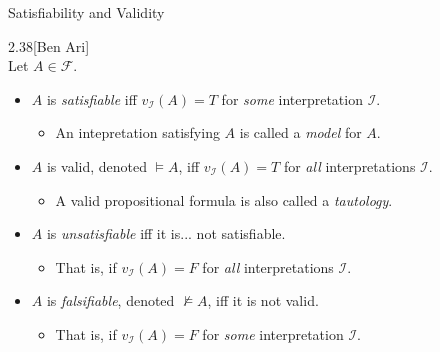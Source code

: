 \begin{wideslide}[bm=,toc=]{Satisfiability and Validity}
\begin{defn}{2.38}[Ben Ari]
~\\Let $A \in \mathcal{F}$.
\begin{itemize}
\item<2-> $A$ is \emph{satisfiable} iff $v_{\mathcal{I}}(A) = T$ for \emph{some}
      interpretation $\mathcal{I}$.\\

\begin{itemize}
\item<3-> An intepretation satisfying $A$ is called a \emph{model} for $A$.
\end{itemize}

\item<4-> $A$ is valid, denoted $\models A$, iff $v_{\mathcal{I}}(A)=T$ for
      \emph{all} interpretations $\mathcal{I}$.\\
\begin{itemize}
\item<5-> A valid propositional formula is also called a \emph{tautology}.
\end{itemize}

\item<6-> $A$ is \emph{unsatisfiable} iff it is... \pause[6] not satisfiable. 
\begin{itemize}
\item<8-> That is, if
      $v_{\mathcal{I}}(A) = F$ for \emph{all} interpretations $\mathcal{I}$.
\end{itemize}

\item<9-> $A$ is \emph{falsifiable}, denoted $\not\models A$, iff it is not valid.
\begin{itemize}
\item<10->  That is, if $v_{\mathcal{I}}(A) = F$ for \emph{some} interpretation
      $\mathcal{I}$.
\end{itemize}
\end{itemize}
\end{defn}
\end{wideslide}


